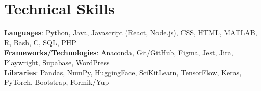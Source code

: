 \section{Technical Skills}
 \begin{itemize}[leftmargin=0.15in, label={}]
    \small{\item{
     \textbf{Languages}{: Python, Java, Javascript (React, Node.js), CSS, HTML, MATLAB, R, Bash, C, SQL, PHP} \\
     \textbf{Frameworks/Technologies}{: Anaconda, Git/GitHub, Figma, Jest, Jira, Playwright, Supabase, WordPress} \\
     \textbf{Libraries}{: Pandas, NumPy, HuggingFace, SciKitLearn, TensorFlow, Keras, PyTorch, Bootstrap, Formik/Yup}
    }}
 \end{itemize}